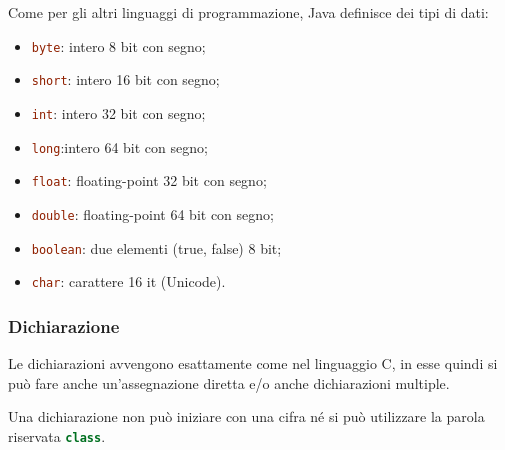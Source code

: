 \documentclass{subfiles}
\begin{document}
    Come per gli altri linguaggi di programmazione, Java definisce dei tipi di dati:
    \begin{itemize}
        \item \lstinline[language = Java]{byte}: intero 8 bit con segno;
        \item \lstinline[language = Java]{short}: intero 16 bit con segno;
        \item \lstinline[language = Java]{int}: intero 32 bit con segno;
        \item \lstinline[language = Java]{long}:intero 64 bit con segno;
        \item \lstinline[language = Java]{float}: floating-point 32 bit con segno;
        \item \lstinline[language = Java]{double}: floating-point 64 bit con segno;
        \item \lstinline[language = Java]{boolean}: due elementi (true, false) 8 bit;
        \item \lstinline[language = Java]{char}: carattere 16  it (Unicode).
    \end{itemize}

    \subsubsection{Dichiarazione}
    Le dichiarazioni avvengono esattamente come nel linguaggio C, in esse quindi si può fare anche un'assegnazione diretta
    e/o anche dichiarazioni multiple.

    \begin{Note*}
        Una dichiarazione non può iniziare con una cifra né si può utilizzare la parola riservata \lstinline[language = java]{class}.
    \end{Note*}
\end{document}
